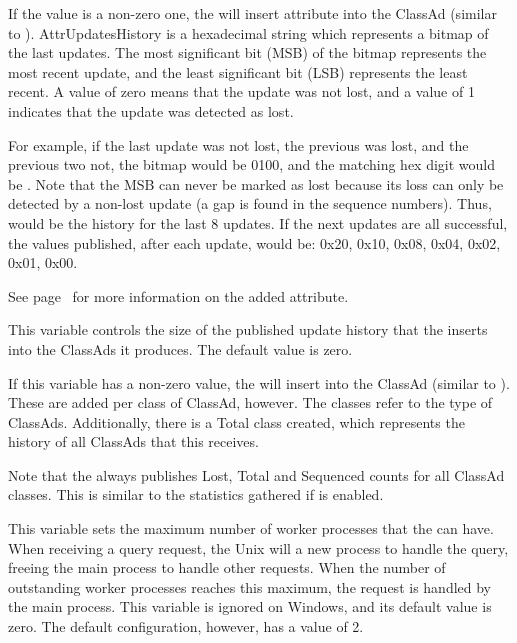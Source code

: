 \begin{description}
  If the value is a non-zero one, the  will insert
  attribute
   into the ClassAd (similar to ).
  Attr{UpdatesHistory} is a hexadecimal string which represents
  a bitmap of the last  updates.
  The most significant bit (MSB) of the bitmap represents the
  most recent update, and the least significant bit (LSB) represents
  the least recent.  A value of zero means that the update was not lost,
  and a value of 1 indicates that the update was detected as lost.

  For example, if the last update was not lost, the previous was lost, and
  the previous two not, the bitmap would be 0100, and the matching hex
  digit would be .  Note that the MSB can never be marked as lost
  because its loss can only be detected by a non-lost update 
  (a gap is found in the sequence numbers).  
  Thus,  
  would be the history for the last 8 updates.  
  If the next updates are all successful, the values published,
  after each update,
  would be: 0x20, 0x10, 0x08, 0x04, 0x02, 0x01, 0x00.

  See page~\pageref{sec:Collector-Added-Attributes} for more information on the
  added attribute.


\label{param:CollectorClassHistorySize}
\item[\Macro{COLLECTOR\_CLASS\_HISTORY\_SIZE}]
  This variable controls the
  size of the published update history that the  inserts into
  the  ClassAds it produces.  
  The default value is zero.

  If this variable has a non-zero value, the  will insert
   into the  ClassAd 
  (similar to ).  
  These are added per class of ClassAd, however.  
  The classes refer to the type of ClassAds.
  Additionally, there is a Total class created,
  which represents the history of all ClassAds that this 
  receives.

  Note that the  always publishes Lost, Total and Sequenced
  counts for all ClassAd classes.  This is similar to the
  statistics gathered if  is enabled.

\label{param:CollectorQueryWorkers}
\item[\Macro{COLLECTOR\_QUERY\_WORKERS}]
  This variable sets the maximum
  number of worker processes that the  can have.  
  When receiving a query request, 
  the Unix  will  a new
  process to handle the query, freeing the main process to handle
  other requests.  When the number of outstanding worker processes
  reaches this maximum, the request is handled by the main process.
  This variable is ignored on Windows, and its default value is zero.
  The default configuration, however, has a value of 2.


\end{description}
